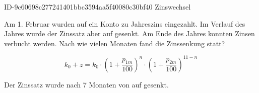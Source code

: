 \begin{exercise}
      {ID-9c60698c277241401bbc3594aa5f40080c30bf40}
      {Zinswechsel}
  \ifproblem\problem\par
    Am 1. Februar wurden  auf ein Konto zu 
    Jahreszins eingezahlt. Im Verlauf des Jahres wurde der Zinssatz aber
    auf  gesenkt. Am Ende des Jahres konnten  Zinsen
    verbucht werden. Nach wie vielen Monaten fand die Zinssenkung statt?
  \fi
  \ifoutline\outline\par
    \begin{equation*}
      k_{0}+z
      =
      k_{0}
      \cdot\left(1+\frac{p_{1m}}{100}\right)^{n}
      \cdot\left(1+\frac{p_{2m}}{100}\right)^{11-n}
    \end{equation*}
  \fi
  \ifoutcome\outcome\par
    Der Zinssatz wurde nach \num{7} Monaten von  auf 
    gesenkt.
  \fi
\end{exercise}
